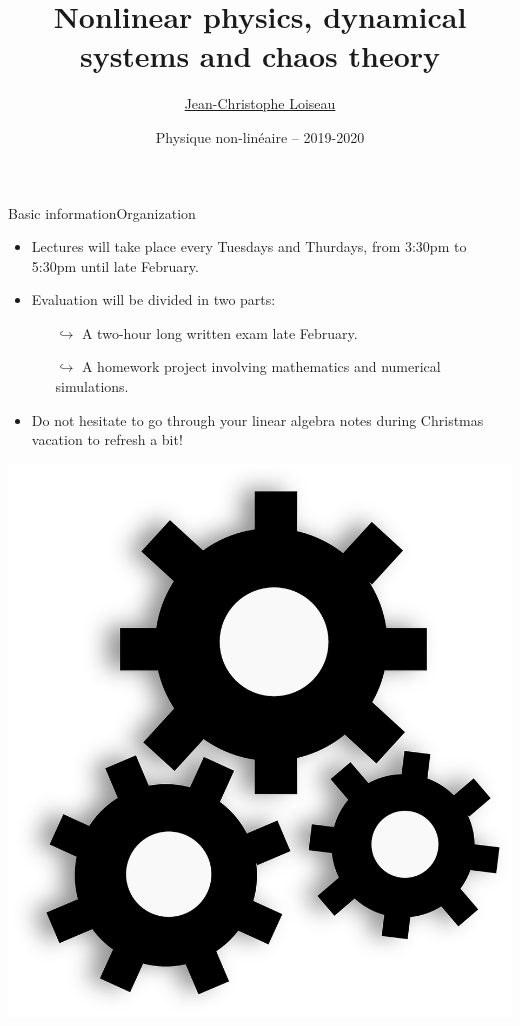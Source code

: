 \documentclass[usenames,dvipsnames,svgnames,10pt,aspectratio=169]{beamer}
\title[Nonlinear physics] %
{
	Nonlinear physics, dynamical \\
	systems and chaos theory
}
\author[J.-Ch.~Loiseau] %
{
	\underline{Jean-Christophe Loiseau}
}
\institute[unused]
{
	\url{jean-christophe.loiseau@ensam.eu} \\
	Laboratoire DynFluid \\
	Arts et M\'etiers, France.
}
\date[unused]{Physique non-lin\'eaire -- 2019-2020}
\begin{document}
\titleframe	%


\begin{frame}[t, c]{Basic information}{Organization}
	\begin{minipage}{.68\textwidth}
		\begin{itemize}
			\item Lectures will take place every Tuesdays and Thurdays, from 3:30pm to 5:30pm until late February.

			\bigskip

			\item Evaluation will be divided in two parts:
			\begin{itemize}
				\item[\( \hookrightarrow \)] A two-hour long written exam late February.
				\item[\( \hookrightarrow \)] A homework project involving mathematics and numerical simulations.
			\end{itemize}

			\medskip

			\item Do not hesitate to go through your linear algebra notes during Christmas vacation to refresh a bit!
		\end{itemize}
	\end{minipage}%
	\hfill
	\begin{minipage}{.28\textwidth}
		\centering
		\includegraphics[width=\textwidth]{Gears}
	\end{minipage}

	\vspace{1cm}
\end{frame}
\end{document}
